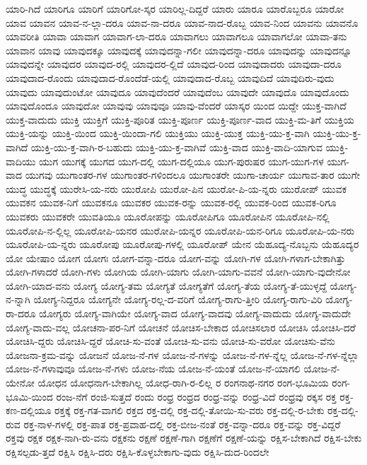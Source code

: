{ಯಾರಿ-ಗಿದೆ
ಯಾರಿಗೂ
ಯಾರಿಗೆ
ಯಾರಿಗೋ-ಸ್ಕರ
ಯಾರಿಲ್ಲ-ದಿದ್ದರೆ
ಯಾರು
ಯಾರೂ
ಯಾರೊಬ್ಬರೂ
ಯಾರೋ
ಯಾವ
ಯಾವನ
ಯಾವ-ನ-ಲ್ಲಾ-ದರೂ
ಯಾವ-ನಾ-ದರೂ
ಯಾವ-ನಾದ-ರೊಬ್ಬ
ಯಾವ-ನಿಂದ
ಯಾವನು
ಯಾವನೊ
ಯಾವರೀತಿ
ಯಾವಾ
ಯಾವಾಗ
ಯಾವಾಗ-ಲಾ-ದರೂ
ಯಾವಾಗಲು
ಯಾವಾಗಲೂ
ಯಾವಾಗಲೋ
ಯಾವಾ-ತನು
ಯಾವಾನ
ಯಾವು
ಯಾವುದಕ್ಕೂ
ಯಾವುದಕ್ಕೆ
ಯಾವುದನ್ನಾ-ಗಲೀ
ಯಾವುದನ್ನಾ-ದರೂ
ಯಾವುದನ್ನು
ಯಾವುದನ್ನೂ
ಯಾವುದನ್ನೇ
ಯಾವುದರ
ಯಾವುದ-ರಲ್ಲಿ
ಯಾವುದರ-ಲ್ಲಿದೆ
ಯಾವುದ-ರಿಂದ
ಯಾವುದಾದರು
ಯಾವುದಾ-ದರೂ
ಯಾವುದಾದ-ರೊಂದು
ಯಾವುದಾದ-ರೊಂದೆಡೆ-ಯಲ್ಲಿ
ಯಾವುದಾದ-ರೊಬ್ಬ
ಯಾವುದಿದೆ
ಯಾವುದಿರು-ವುದು
ಯಾವುದು
ಯಾವುದುಂಟೋ
ಯಾವುದೂ
ಯಾವುದೆಂದರೆ
ಯಾವುದೆಂಬ
ಯಾವುದೇ
ಯಾವುದೊ
ಯಾವುದೊಂದು
ಯಾವುದೊಂದೂ
ಯಾವುದೋ
ಯಾವುವು
ಯಾವುವೂ
ಯಾವು-ವೆಂದರೆ
ಯಾಸ್ಕರ
ಯಿಂದ
ಯಿದ್ದೇ
ಯುಕ್ತ-ವಾಗಿದೆ
ಯುಕ್ತ-ವಾದುದು
ಯುಕ್ತಿ
ಯುಕ್ತಿಗೆ
ಯುಕ್ತಿ-ಪೂರಿತ
ಯುಕ್ತಿ-ಪೂರ್ಣ
ಯುಕ್ತಿ-ಪೂರ್ಣ-ವಾದ
ಯುಕ್ತಿ-ಮ-ತಿಗೆ
ಯುಕ್ತಿಯ
ಯುಕ್ತಿ-ಯನ್ನು
ಯುಕ್ತಿ-ಯಿಂದ
ಯುಕ್ತಿ-ಯಿಂದಾ-ಗಲಿ
ಯುಕ್ತಿಯು
ಯುಕ್ತಿ-ಯುಕ್ತ
ಯುಕ್ತಿ-ಯು-ಕ್ತ-ವಾಗಿ
ಯುಕ್ತಿ-ಯು-ಕ್ತ-ವಾಗಿದೆ
ಯುಕ್ತಿ-ಯು-ಕ್ತ-ವಾಗಿ-ರ-ಬಹುದು
ಯುಕ್ತಿ-ಯು-ಕ್ತ-ವಾಗಿವೆ
ಯುಕ್ತಿ-ವಾದ
ಯುಕ್ತಿ-ವಾದಿ-ಯಾಗುವ
ಯುಕ್ತಿ-ವಾದಿಯು
ಯುಗ
ಯುಗಕ್ಕೆ
ಯುಗದ
ಯುಗ-ದಲ್ಲಿ
ಯುಗ-ದಲ್ಲಿಯೂ
ಯುಗ-ಪುರುಷರ
ಯುಗ-ಯುಗ-ಗಳ
ಯುಗ-ವಾದ
ಯುಗವು
ಯುಗಾಂತರ-ಗಳ
ಯುಗಾಂತರ-ಗಳಿಂದಲೂ
ಯುಗಾಂತರೇ
ಯುಗಾ-ಚಾರ್ಯ
ಯುಗಾವ-ತಾರ
ಯುಗೇ
ಯುದ್ಧ
ಯುದ್ಧಕ್ಕೆ
ಯುರೇಸಿ-ಯ-ನರು
ಯುರೋಪಿ
ಯುರೋ-ಪಿನ
ಯುರೋ-ಪಿ-ಯ-ನ್ನರು
ಯುರೋಪ್
ಯುವಕ
ಯುವಕನ
ಯುವಕ-ನಿಗೆ
ಯುವಕನೂ
ಯುವಕರ
ಯುವಕ-ರನ್ನು
ಯುವಕ-ರಲ್ಲಿ
ಯುವಕ-ರಿಂದ
ಯುವಕ-ರಿಗೂ
ಯುವಕರು
ಯುವಕರೇ
ಯುವತಿಯೂ
ಯೂರೋಪನ್ನು
ಯೂರೋಪಿಗೂ
ಯೂರೋಪಿನ
ಯೂರೋಪಿ-ನಲ್ಲಿ
ಯೂರೋಪಿ-ನ-ಲ್ಲಿಲ್ಲ
ಯೂರೋಪಿ-ಯನರ
ಯುರೋಪಿ-ಯನ್ನರ
ಯೂರೋಪಿ-ಯನ-ರಿಗೂ
ಯೂರೋಪಿ-ಯ-ನರು
ಯೂರೋಪಿ-ಯ-ನ್ನರು
ಯೂರೋಪು
ಯೂರೋಪು-ಗಳಲ್ಲಿ
ಯೂರೋಪ್
ಯೇನ
ಯೆಹೂದ್ಯ-ನೊಬ್ಬನು
ಯೆಹೂದ್ಯರ
ಯೋ
ಯೇಷಾಂ
ಯೋಗ
ಯೋಗಃ
ಯೋಗ-ವನ್ನಾ-ದರೂ
ಯೋಗ-ವನ್ನು
ಯೋಗಿ-ಗಳ
ಯೋಗಿ-ಗಳಾಗ-ಬೇಕಾಗಿತ್ತು
ಯೋಗಿ-ಗಳಾದರೆ
ಯೋಗಿ-ಗಳು
ಯೋಗಿಯ
ಯೋಗಿ-ಯಾಗು
ಯೋಗಿ-ಯಾಗು-ವವನೆ
ಯೋಗಿ-ಯಾಗು-ವುದೇನೋ
ಯೋಗಿ-ಯಾದ-ವನು
ಯೋಗ್ಯ
ಯೋಗ್ಯ-ತಮ
ಯೋಗ್ಯತೆ
ಯೋಗ್ಯತೆಗೆ
ಯೋಗ್ಯ-ತೆಯ
ಯೋಗ್ಯ-ತೆ-ಯುಳ್ಳದ್ದೆ
ಯೋಗ್ಯ-ನ-ನ್ನಾಗಿ
ಯೋಗ್ಯ-ನಿದ್ದರೂ
ಯೋಗ್ಯನೇ
ಯೋಗ್ಯ-ರಲ್ಲ-ದ-ವರಿಗೆ
ಯೋಗ್ಯ-ರಾಗು-ತ್ತೀರಿ
ಯೋಗ್ಯ-ರಾಗು-ವಿರಿ
ಯೋಗ್ಯ-ರಾ-ದರೂ
ಯೋಗ್ಯರು
ಯೋಗ್ಯ-ವಾಗಿಯೇ
ಯೋಗ್ಯ-ವಾದ
ಯೋಗ್ಯ-ವಾದವು
ಯೋಗ್ಯ-ವಾದುದು
ಯೋಗ್ಯ-ವಾದುದೇ
ಯೋಗ್ಯ-ವಾದು-ವಲ್ಲ
ಯೋಚನಾ-ಪರ-ನಿಗೆ
ಯೋಚನೆ
ಯೋಚಿಸ-ಬೇಕಾದ
ಯೋಚಿಸಲಾರ
ಯೋಚಿಸಿ
ಯೋಚಿಸಿ-ದರೆ
ಯೋಚಿಸಿ-ದ್ದರು
ಯೋಚಿಸಿ-ದ್ದರೆ
ಯೋಚಿ-ಸು-ವಂತೆ
ಯೋಚಿ-ಸು-ವನು
ಯೋಚಿ-ಸು-ವರೋ
ಯೋಚಿಸು-ವೆನು
ಯೋಜನಾ-ಕ್ರಮ-ವನ್ನು
ಯೋಜನೆ
ಯೋಜ-ನೆ-ಗಳ
ಯೋಜ-ನೆ-ಗಳನ್ನು
ಯೋಜ-ನೆ-ಗಳ-ನ್ನೆಲ್ಲ
ಯೋಜ-ನೆ-ಗಳ-ನ್ನೆಲ್ಲಾ
ಯೋಜ-ನೆ-ಗಳಾವುವೂ
ಯೋಜ-ನೆ-ಗಳು
ಯೋಜ-ನೆಯ
ಯೋಜ-ನೆ-ಯಂತೆ
ಯೋಜ-ನೆ-ಯಾಗಲಿ
ಯೋಜ-ನೆ-ಯೇನೋ
ಯೋಧನ
ಯೋಧನಾಗ-ಬೇಕಾಗಿಲ್ಲ
ಯೋಧ-ರಾಗಿ-ರ-ಲಿಲ್ಲ
ರ
ರಂಗನಾಥ-ನಗರ
ರಂಗ-ಭೂಮಿಯ
ರಂಗ-ಭೂಮಿ-ಯಿಂದ
ರಂಜ-ನೆಗೆ
ರಂಜಿ-ಸುತ್ತದೆ
ರಂದು
ರಂಧ್ರ
ರಂಧ್ರದ
ರಂಧ್ರ-ವನ್ನು
ರಂಧ್ರ-ವಿದೆ
ರಂಧ್ರವು
ರಕ್ಕಸ
ರಕ್ತ
ರಕ್ತ-ಕಣ-ದಲ್ಲಿಯೂ
ರಕ್ತಕ್ಕೆ
ರಕ್ತ-ಗತ-ವಾಗಲಿ
ರಕ್ತದ
ರಕ್ತ-ದಲ್ಲಿ
ರಕ್ತ-ದಲ್ಲಿ-ತೋಯಿ-ಸು-ವರು
ರಕ್ತ-ದಲ್ಲಿ-ರ-ಬೇಕು
ರಕ್ತ-ದಲ್ಲಿ-ರುವ
ರಕ್ತ-ನಾಳ-ಗಳಲ್ಲಿ
ರಕ್ತ-ಪಾತ
ರಕ್ತ-ಪ್ರವಾಹ-ದಲ್ಲಿ
ರಕ್ತ-ಬೀಜ-ನಂತೆ
ರಕ್ತ-ವನ್ನಾ-ದರೂ
ರಕ್ತ-ವನ್ನು
ರಕ್ತ-ವಿದ್ದರೆ
ರಕ್ತವು
ರಕ್ಷಕ
ರಕ್ಷಕ-ನಾಗಿ-ರು-ವನು
ರಕ್ಷಕನು
ರಕ್ಷಣೆ
ರಕ್ಷಣೆ-ಗಾಗಿ
ರಕ್ಷಣೆಗೆ
ರಕ್ಷಣೆ-ಯನ್ನು
ರಕ್ಷಿಸ-ಬೇಕಾಗಿದೆ
ರಕ್ಷಿಸ-ಬೇಕು
ರಕ್ಷಿಸಲ್ಪಡು-ತ್ತದೆ
ರಕ್ಷಿಸಿ
ರಕ್ಷಿಸಿ-ದರು
ರಕ್ಷಿಸಿ-ಕೊಳ್ಳಬೇಕಾಗು-ವುದು
ರಕ್ಷಿಸಿ-ದುದ-ರಿಂದಲೇ
}
